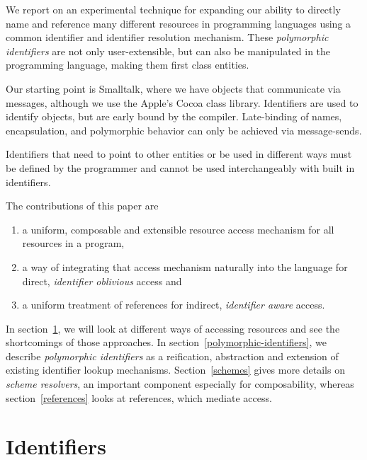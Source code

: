 \documentclass[preprint,authoryear]{acm_proc_article-sp}
\begin{document}
We report on an experimental
technique for expanding our ability to directly name and reference many different 
resources
in programming languages using a common identifier and identifier resolution
mechanism.
These \emph{polymorphic identifiers} are not only user-extensible,
but can also be manipulated in the programming language, making them first class 
entities.

Our starting point is Smalltalk, where we have objects
that communicate via messages\cite{Goldberg1983}, although we use the Apple's Cocoa
class library\cite{Cocoa}.  Identifiers are used to identify 
objects, but are early bound by the compiler.  Late-binding of names, encapsulation,
and polymorphic behavior can only be achieved via message-sends.


Identifiers that need to point to other entities or be used in different ways must be defined
by the programmer and cannot be used interchangeably with built in identifiers.  

The contributions of this paper are
\begin{enumerate} \item a uniform, composable and extensible resource access mechanism for all
resources in a program, \item  a way of integrating that access mechanism naturally into the language for
direct, {\em identifier oblivious} access and
\item a uniform treatment of references for indirect, {\em identifier aware} access.
\end{enumerate}

In section~\ref{identifiers}, we will look at different ways of accessing resources and see
the shortcomings of those approaches.  In section~\ref{polymorphic-identifiers}, we 
describe {\em polymorphic identifiers} as a reification, abstraction and extension of existing 
identifier lookup mechanisms.  Section~\ref{schemes} gives more details on {\em scheme resolvers},
an important component especially for composability, whereas section~\ref{references} looks
at references, which mediate access.  








\section{Identifiers}
\label{identifiers}
\end{document}
